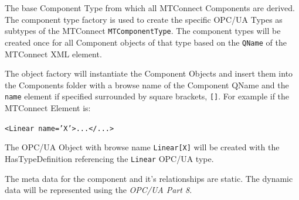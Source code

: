 \FloatBarrier

The base Component Type from which all MTConnect Components are derived. The 
component type factory is used to create the specific OPC/UA Types as subtypes of the 
MTConnect \texttt{MTComponentType}. The component types will be created once for all Component objects 
of that type based on the \texttt{QName} of the MTConnect XML element. 

The object factory will instantiate the Component Objects and insert them into the Components 
folder with a browse name of the Component QName and the \texttt{name} element if specified surrounded 
by square brackets, \texttt{[]}. For example if the MTConnect Element is:

\texttt{<Linear name='X'>...</...>}

The OPC/UA Object with browse name \texttt{Linear[X]} will be created with the HasTypeDefinition 
referencing the \texttt{Linear} OPC/UA type. 

The meta data for the component and it's relationships are static. The dynamic data will be 
represented using the \textit{OPC/UA Part 8}.




